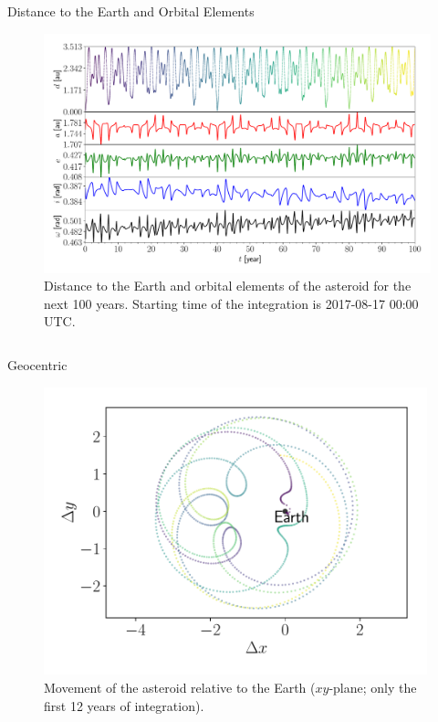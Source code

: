 \documentclass[final]{beamer}
\newlength{\onecolwid}
\newlength{\twocolwid}
\begin{document}
\begin{frame}[t]
\begin{columns}[t]
\begin{column}{\twocolwid}
\begin{block}{Distance to the Earth and Orbital Elements}
\begin{figure}
\includegraphics[width=0.99\linewidth]{daeiw.pdf}
\caption{Distance to the Earth and orbital elements of the asteroid for the next 100 years. Starting time of the integration is 2017-08-17 00:00 UTC.}
\end{figure}
\end{block}

\begin{columns}[t, totalwidth=\twocolwid] %

\begin{column}{\onecolwid}\vspace{-.6in}
\begin{block}{Geocentric}
\begin{figure}
\includegraphics[width=0.99\textwidth]{geocentric.pdf}
\caption{Movement of the asteroid relative to the Earth ($xy$-plane; only the first 12 years of integration).}
\end{figure}
\end{block}
\end{column}


\end{columns}
\end{column}
\end{columns}
\end{frame}
\end{document}
